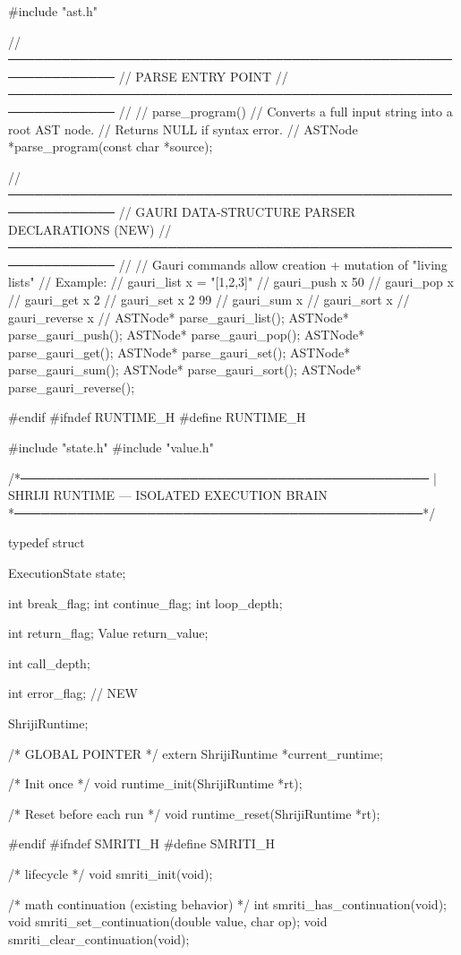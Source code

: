 \documentclass{article}
\begin{document}
#include "ast.h"

//──────────────────────────────────────────────────────────────
//  PARSE ENTRY POINT
//──────────────────────────────────────────────────────────────
//
//  parse_program()
//      Converts a full input string into a root AST node.
//      Returns NULL if syntax error.
//
ASTNode *parse_program(const char *source);


//──────────────────────────────────────────────────────────────
//  GAURI DATA-STRUCTURE PARSER DECLARATIONS (NEW)
//──────────────────────────────────────────────────────────────
//
//  Gauri commands allow creation + mutation of "living lists"
//  Example:
//      gauri_list x = "[1,2,3]"
//      gauri_push x 50
//      gauri_pop x
//      gauri_get x 2
//      gauri_set x 2 99
//      gauri_sum x
//      gauri_sort x
//      gauri_reverse x
//
ASTNode* parse_gauri_list();
ASTNode* parse_gauri_push();
ASTNode* parse_gauri_pop();
ASTNode* parse_gauri_get();
ASTNode* parse_gauri_set();
ASTNode* parse_gauri_sum();
ASTNode* parse_gauri_sort();
ASTNode* parse_gauri_reverse();

#endif
#ifndef RUNTIME_H
#define RUNTIME_H

#include "state.h"
#include "value.h"

/*──────────────────────────────────────────────
 | SHRIJI RUNTIME — ISOLATED EXECUTION BRAIN
 *──────────────────────────────────────────────*/

typedef struct {

    ExecutionState state;

    int break_flag;
    int continue_flag;
    int loop_depth;

    int return_flag;
    Value return_value;

    int call_depth;

    int error_flag;   // NEW

} ShrijiRuntime;

/* GLOBAL POINTER */
extern ShrijiRuntime *current_runtime;

/* Init once */
void runtime_init(ShrijiRuntime *rt);

/* Reset before each run */
void runtime_reset(ShrijiRuntime *rt);

#endif
#ifndef SMRITI_H
#define SMRITI_H

/* lifecycle */
void smriti_init(void);

/* math continuation (existing behavior) */
int  smriti_has_continuation(void);
void smriti_set_continuation(double value, char op);
void smriti_clear_continuation(void);
\end{document}
